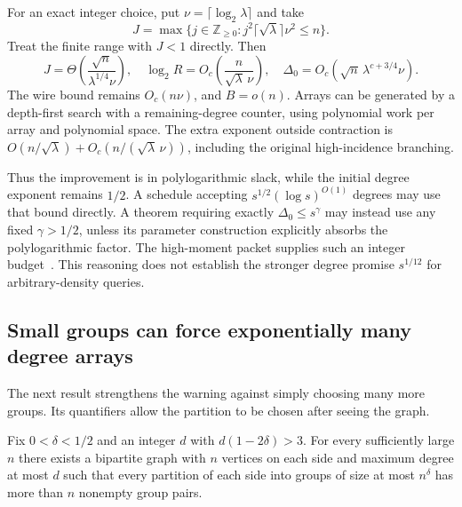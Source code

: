 For an exact integer choice, put $\nu=\lceil\log_2\lambda\rceil$ and take
\[
 J=\max\{j\in\mathbb Z_{\ge0}:
               j^2\lceil\sqrt\lambda\rceil\nu^2\le n\}.
\]
Treat the finite range with $J<1$ directly. Then
\[
 J=\Theta\!\left(\frac{\sqrt n}{\lambda^{1/4}\nu}\right),\quad
 \log_2R=O_c\!\left(\frac n{\sqrt\lambda\,\nu}\right),\quad
 \Delta_0=O_c(\sqrt n\,\lambda^{c+3/4}\nu).
\]
The wire bound remains $O_c(n\nu)$, and $B=o(n)$.
Arrays can be generated by a depth-first search with a remaining-degree
counter, using polynomial work per array and polynomial space.
The extra exponent outside contraction is
$O(n/\sqrt\lambda)+O_c(n/(\sqrt\lambda\,\nu))$, including the original
high-incidence branching.

Thus the improvement is in polylogarithmic slack, while the initial degree
exponent remains $1/2$. A schedule accepting
$s^{1/2}(\log s)^{O(1)}$ degrees may use that bound directly. A theorem
requiring exactly $\Delta_0\le s^\gamma$ may instead use any fixed
$\gamma>1/2$, unless its parameter construction explicitly absorbs the
polylogarithmic factor. The high-moment packet supplies such an integer
budget~\cite{highmoment}. This reasoning does not establish the stronger
degree promise $s^{1/12}$ for arbitrary-density queries.

\subsection{Small groups can force exponentially many degree arrays}

The next result strengthens the warning against simply choosing many more
groups. Its quantifiers allow the partition to be chosen after seeing the
graph.

\begin{theorem}
\label{thm:group-obstruction}
Fix $0<\delta<1/2$ and an integer $d$ with
$d(1-2\delta)>3$. For every sufficiently large $n$ there exists a bipartite
graph with $n$ vertices on each side and maximum degree at most $d$ such
that every partition of each side into groups of size at most $n^\delta$
has more than $n$ nonempty group pairs.
\end{theorem}

